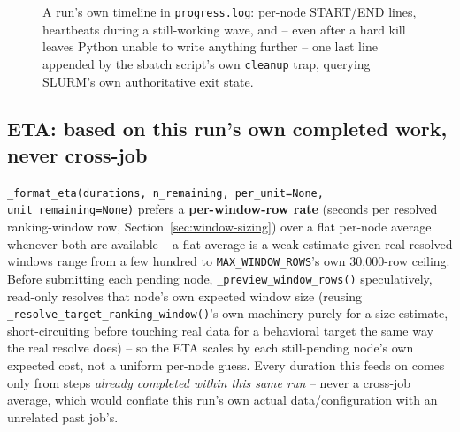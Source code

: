 \documentclass[11pt]{article}
\begin{document}
\begin{figure}[h]
\centering
{}
\caption{A run's own timeline in \texttt{progress.log}: per-node START/END lines, heartbeats during a still-working wave, and -- even after a hard kill leaves Python unable to write anything further -- one last line appended by the sbatch script's own \texttt{cleanup} trap, querying SLURM's own authoritative exit state.}
\label{fig:progress-log-timeline}
\end{figure}

\subsection{ETA: based on this run's own completed work, never cross-job}
\texttt{\_format\_eta(durations, n\_remaining, per\_unit=None, unit\_remaining=None)} prefers a \textbf{per-window-row rate} (seconds per resolved ranking-window row, Section~\ref{sec:window-sizing}) over a flat per-node average whenever both are available -- a flat average is a weak estimate given real resolved windows range from a few hundred to \texttt{MAX\_WINDOW\_ROWS}'s own 30{,}000-row ceiling. Before submitting each pending node, \texttt{\_preview\_window\_rows()} speculatively, read-only resolves that node's own expected window size (reusing \texttt{\_resolve\_target\_ranking\_window()}'s own machinery purely for a size estimate, short-circuiting before touching real data for a behavioral target the same way the real resolve does) -- so the ETA scales by each still-pending node's own expected cost, not a uniform per-node guess. Every duration this feeds on comes only from steps \emph{already completed within this same run} -- never a cross-job average, which would conflate this run's own actual data/configuration with an unrelated past job's.
\end{document}
